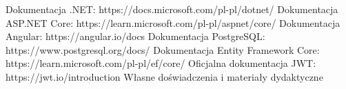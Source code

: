 \documentclass[polish,12pt,twoside,a4paper]{report}
\begin{document}




\newpage








\begin{thebibliography}{6}

 Dokumentacja .NET: https://docs.microsoft.com/pl-pl/dotnet/
 Dokumentacja ASP.NET Core: https://learn.microsoft.com/pl-pl/aspnet/core/
 Dokumentacja Angular: https://angular.io/docs
 Dokumentacja PostgreSQL: https://www.postgresql.org/docs/
 Dokumentacja Entity Framework Core: https://learn.microsoft.com/pl-pl/ef/core/
 Oficjalna dokumentacja JWT: https://jwt.io/introduction
 Własne doświadczenia i materiały dydaktyczne
\end{thebibliography}
\newpage


\end{document}
